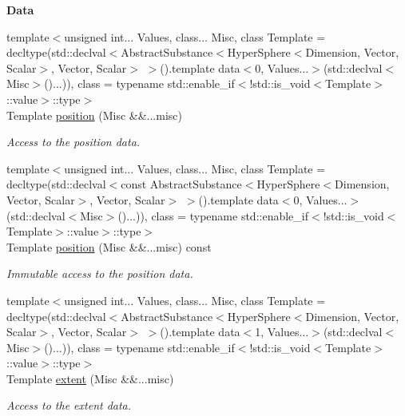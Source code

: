 \begin{Indent}{\bf Data}\par
\begin{DoxyCompactItemize}
\item 
{\footnotesize template$<$unsigned int... Values, class... Misc, class Template  = decltype(std\-::declval$<$\-Abstract\-Substance$<$\-Hyper\-Sphere$<$\-Dimension, Vector, Scalar$>$, Vector, Scalar$>$ $>$().\-template data$<$0, Values...$>$(std\-::declval$<$\-Misc$>$()...)), class  = typename std\-::enable\-\_\-if$<$!std\-::is\-\_\-void$<$\-Template$>$\-::value$>$\-::type$>$ }\\Template \hyperlink{exceptionmagrathea_1_1HyperSphere_a6cfc0eb76f815a76ced79309c599c792}{position} (Misc \&\&...misc)
\begin{DoxyCompactList}\small\item\em Access to the position data. \end{DoxyCompactList}\item 
{\footnotesize template$<$unsigned int... Values, class... Misc, class Template  = decltype(std\-::declval$<$const Abstract\-Substance$<$\-Hyper\-Sphere$<$\-Dimension, Vector, Scalar$>$, Vector, Scalar$>$ $>$().\-template data$<$0, Values...$>$(std\-::declval$<$\-Misc$>$()...)), class  = typename std\-::enable\-\_\-if$<$!std\-::is\-\_\-void$<$\-Template$>$\-::value$>$\-::type$>$ }\\Template \hyperlink{exceptionmagrathea_1_1HyperSphere_a9b740a84f681ed3e93f5c2e40d1020c3}{position} (Misc \&\&...misc) const 
\begin{DoxyCompactList}\small\item\em Immutable access to the position data. \end{DoxyCompactList}\item 
{\footnotesize template$<$unsigned int... Values, class... Misc, class Template  = decltype(std\-::declval$<$\-Abstract\-Substance$<$\-Hyper\-Sphere$<$\-Dimension, Vector, Scalar$>$, Vector, Scalar$>$ $>$().\-template data$<$1, Values...$>$(std\-::declval$<$\-Misc$>$()...)), class  = typename std\-::enable\-\_\-if$<$!std\-::is\-\_\-void$<$\-Template$>$\-::value$>$\-::type$>$ }\\Template \hyperlink{exceptionmagrathea_1_1HyperSphere_a1d52a7a65a6c83e8bfd191a6bd54ded1}{extent} (Misc \&\&...misc)
\begin{DoxyCompactList}\small\item\em Access to the extent data. \end{DoxyCompactList}\item 

\end{DoxyCompactItemize}
\end{Indent}
